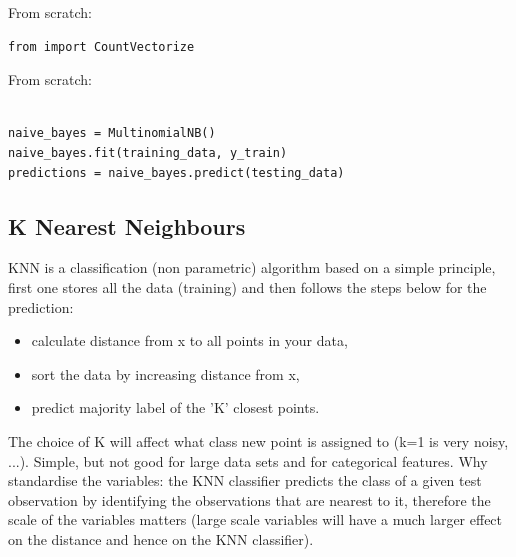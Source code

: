 \documentclass[12pt]{article}
\begin{document}
From scratch:
\begin{lstlisting}
from import CountVectorize

\end{lstlisting}

From scratch:
\begin{lstlisting}

naive_bayes = MultinomialNB()
naive_bayes.fit(training_data, y_train)
predictions = naive_bayes.predict(testing_data)
\end{lstlisting}

\subsection{K Nearest Neighbours} \label{K_Nearest_Neighbours} 
KNN is a classification (non parametric) algorithm based on a simple principle, first one stores all the data (training) and then follows the steps below for the prediction:
\begin{itemize}
	\item calculate distance from x to all points in your data,
	\item sort the data by increasing distance from x,
	\item predict majority label of the 'K' closest points.
\end{itemize}
The choice of K will affect what class new point is assigned to (k=1 is very noisy, ...). Simple, but not good for large data sets and for categorical features.
Why standardise the variables: the KNN classifier predicts the class of a given test observation by identifying the observations that are nearest to it, therefore the scale of the variables matters (large scale variables will have a much larger effect on the distance and hence on the KNN classifier).
\end{document}
